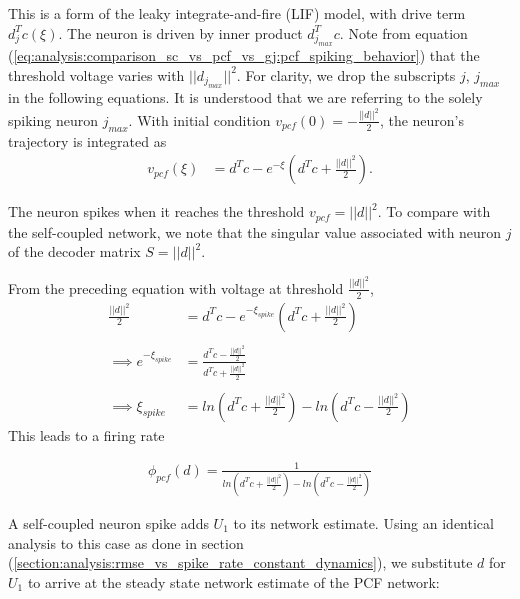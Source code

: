 \begin{enumerate}
This is a form of the leaky integrate-and-fire (LIF) model, with drive term $d_j^T c(\xi)$. The neuron is driven by inner product $d_{j_{max}}^T c$. Note from equation (\ref{eq:analysis:comparison_sc_vs_pcf_vs_gj:pcf_spiking_behavior}) that the threshold voltage varies with $||d_{j_{max}}||^2$.  For clarity, we drop the subscripts $j$, $j_{max}$ in the following equations. It is understood that we are referring to the solely spiking neuron $j_{max}$.
With initial condition $v_{pcf}(0) = - \frac{||d||^2}{2}$, the neuron's trajectory is integrated as 
\begin{align}
\label{eq:analysis:comparison_sc_vs_pcf_vs_gj:const_stim:pcf_voltage_trajectory}
	v_{pcf}(\xi)
	&= 
	d^T c - e^{-\xi} 
	\left(
		d^T c + \frac{||d||^2}{2}
	\right). 
\end{align}

The neuron spikes when it reaches the threshold $v_{pcf} = ||d||^2$. To compare with the self-coupled network, we note that the singular value associated with neuron $j$ of the decoder matrix $S = ||d||^2$.

From the preceding equation with voltage at  threshold $\frac{||d||^2}{2}$,
\begin{align*}
	\frac{||d||^2}{2}
	&= 
	d^T c - e^{-\xi_{spike}} 
	\left(
		d^T c + \frac{||d||^2}{2}
	\right)
	\\
	\\
	\implies
	e^{-\xi_{spike}}
	&= 
		\frac
	{
		d^T c - \frac{||d||^2}{2}
	}
	{
		d^T c + \frac{||d||^2}{2}
	}
	\\
	\\
	\implies
	\xi_{spike}
	&= 
	ln
	\left(
		d^T c + \frac{||d||^2}{2}
	\right)
	-
	ln
	\left(
		d^T c - \frac{||d||^2}{2}
	\right)		
\end{align*}
This leads to a firing rate 

\begin{align}
\label{eq:analysis:comparison_sc_vs_pcf_vs_gj:const_dynamics:pcf_spike_rate}
	\phi_{pcf}
	\left(
		d
	\right)
	 =
	 \frac
	 {
	 	1
	 }
	 {
		ln
		\left(
			d^T c + \frac{||d||^2}{2}
		\right)
		-
		ln
		\left(
			d^T c - \frac{||d||^2}{2}
		\right)		
	}
\end{align}


A self-coupled neuron spike adds $U_1$ to its network estimate. Using an identical analysis to this case as done in section (\ref{section:analysis:rmse_vs_spike_rate_constant_dynamics}), we substitute $d$ for $U_1$ to arrive at the steady state network estimate of the PCF network:


\end{enumerate}
